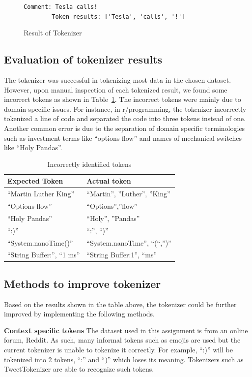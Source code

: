 \documentclass[sigconf,nonacm=true]{acmart}
\begin{document}
\begin{figure}[H]
	\begin{lstlisting}[gobble=10]
	    Comment: Tesla calls!
	    Token results: ['Tesla', 'calls', '!']
	\end{lstlisting}
	\caption{Result of Tokenizer}
\end{figure}

\subsection{Evaluation of tokenizer results}
The tokenizer was successful in tokenizing most data in the chosen dataset. However, upon manual inspection of each tokenized result, we found some incorrect tokens as shown in Table~\ref{tab:token}. The incorrect tokens were mainly due to domain specific issues. For instance, in r/programming, the tokenizer incorrectly tokenized a line of code and separated the code into three tokens instead of one. Another common error is due to the separation of domain specific terminologies such as investment terms like “options flow” and names of mechanical switches like “Holy Pandas”.

\begin{table}[h]
	\begin{tabular}{|l|l|}
	\hline
	 {\bf Expected Token} &  {\bf Actual token} \\ \hline
	 “Martin Luther King”& “Martin”, ”Luther”, ”King”  \\ \hline
	 “Options flow” &  “Options”,”flow” \\ \hline
	 “Holy Pandas”& “Holy”, ”Pandas” \\ \hline
	“:)” &  “:”, “)”\\ \hline
	 “System.nanoTime()”& “System.nanoTime”, “(“,”)” \\ \hline
	“String Buffer:”, “1 ms”  &  “String Buffer:1”, “ms”\\ \hline
	\end{tabular}
	\caption{Incorrectly identified tokens}
	\label{tab:token}
\end{table}


\subsection{Methods to improve tokenizer}
Based on the results shown in the table above, the tokenizer could be further improved by implementing the following methods. \medskip


{\bf Context specific tokens}
The dataset used in this assignment is from an online forum, Reddit. As such, many informal tokens such as emojis are used but the current tokenizer is unable to tokenize it correctly. For example, “:)” will be tokenized into 2 tokens, “:” and “)” which loses its meaning. Tokenizers such as TweetTokenizer are able to recognize such tokens.\bigskip
\end{document}
